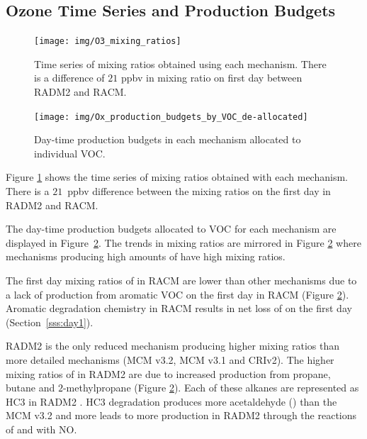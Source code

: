 %
\subsection[O3 Time Series and Ox Production Budgets]{Ozone Time Series and  Production Budgets} \label{ss:O3_time_series}

\begin{figure}
    \centering
    \texttt{[image: img/O3\_mixing\_ratios]}
    \vspace{0mm}
    \caption{Time series of  mixing ratios obtained using each mechanism. There is a difference of $21$ ppbv in  mixing ratio on first day between RADM2 and RACM.}
    \vspace{-4mm}
    \label{f:time_series}
\end{figure}

\begin{figure}
    \centering
    \texttt{[image: img/Ox\_production\_budgets\_by\_VOC\_de-allocated]}
    \vspace{1mm}
    \caption{Day-time  production budgets in each mechanism allocated to individual VOC.}
    \vspace{-4mm}
    \label{f:Ox_tagged_budgets}
\end{figure}

Figure \ref{f:time_series} shows the time series of  mixing ratios obtained with each mechanism.
There is a \mbox{$21$ ppbv} difference between the  mixing ratios on the first day in RADM2 and RACM.

The day-time  production budgets allocated to VOC for each mechanism are displayed in \mbox{Figure \ref{f:Ox_tagged_budgets}}.
The trends in  mixing ratios are mirrored in Figure \ref{f:Ox_tagged_budgets} where mechanisms producing high amounts of  have high  mixing ratios.

The first day mixing ratios of  in RACM are lower than other mechanisms due to a lack of  production from aromatic VOC on the first day in RACM (Figure \ref{f:Ox_tagged_budgets}).
Aromatic degradation chemistry in RACM results in net loss of  on the first day (\mbox{Section \ref{sss:day1}}).

RADM2 is the only reduced mechanism producing higher  mixing ratios than more detailed mechanisms (MCM v3.2, MCM v3.1 and CRIv2).
The higher mixing ratios of  in RADM2 are due to increased  production from propane, butane and $2$-methylpropane (Figure \ref{f:Ox_tagged_budgets}).
Each of these alkanes are represented as HC3 in RADM2 \citep{Stockwell:1990}.
HC3 degradation produces more acetaldehyde () than the MCM v3.2 and more  leads to more  production in RADM2 through the reactions of  and  with NO. 


